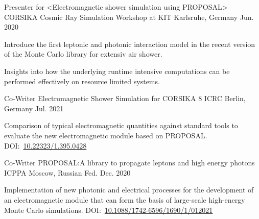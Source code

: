 \documentclass[11pt, a4paper]{Awesome-CV/awesome-cv}
\begin{document}
\begin{cventries}
    \cventry
    {Presenter for <Electromagnetic shower simulation using PROPOSAL>} %
    {CORSIKA Cosmic Ray Simulation Workshop at KIT} %
    {Karlsruhe, Germany} %
    {Jun. 2020} %
    {
        \begin{cvitems} %
        \item {Introduce the first leptonic and photonic interaction model in
                the recent version of the Monte Carlo library for extensiv air
            shower.}
        \item {Insights into how the underlying runtime intensive computations can be performed effectively on resource limited systems.}
        \end{cvitems}
    }

    \cventry
    {Co-Writer} %
    {Electromagnetic Shower Simulation for CORSIKA 8} %
    {ICRC Berlin, Germany} %
    {Jul. 2021} %
    {
        \begin{cvitems} %
        \item {Comparison of typical electromagnetic quantities against standard tools to evaluate the new electromagnetic module based on PROPOSAL.  DOI:~\href{https://doi.org/10.22323/1.395.0428}{10.22323/1.395.0428}
            }
        \end{cvitems}
    }

    \cventry
    {Co-Writer} %
    {PROPOSAL:\@ A library to propagate leptons and high energy photons} %
    {ICPPA Moscow, Russian Fed.} %
    {Dec. 2020} %
    {
        \begin{cvitems} %
        \item {Implementation of new photonic and electrical processes for the
                development of an electromagnetic module that can form the basis of
            large-scale high-energy Monte Carlo simulations. DOI:~\href{https://doi.org/10.1088/1742-6596/1690/1/012021}{10.1088/1742-6596/1690/1/012021}}
        \end{cvitems}
    }
\end{cventries}
\end{document}
